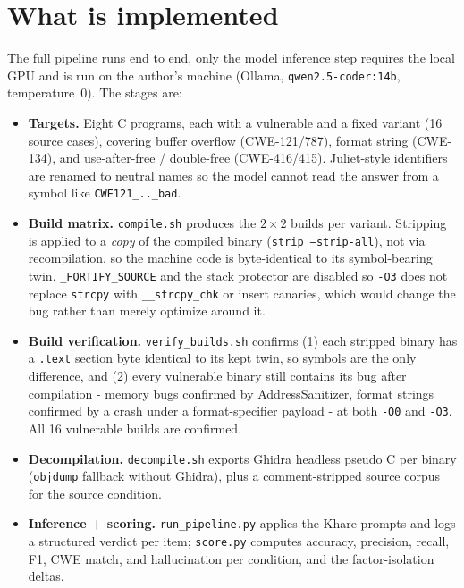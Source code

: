 \documentclass[10pt]{article}
\begin{document}
\section{What is implemented}
The full pipeline runs end to end, only the model inference step requires the
local GPU and is run on the author's machine (Ollama, \texttt{qwen2.5-coder:14b},
temperature~0). The stages are:
\begin{itemize}
\item \textbf{Targets.} Eight C programs, each with a vulnerable and a fixed
variant (16 source cases), covering buffer overflow (CWE-121/787), format string
(CWE-134), and use-after-free / double-free (CWE-416/415). Juliet-style
identifiers are renamed to neutral names so the model cannot read the answer from
a symbol like \texttt{CWE121\_..\_bad}.
\item \textbf{Build matrix.} \texttt{compile.sh} produces the $2\times2$ builds per
variant. Stripping is applied to a \emph{copy} of the compiled binary
(\texttt{strip --strip-all}), not via recompilation, so the machine code is
byte-identical to its symbol-bearing twin. \texttt{\_FORTIFY\_SOURCE} and the
stack protector are disabled so \texttt{-O3} does not replace \texttt{strcpy}
with \texttt{\_\_strcpy\_chk} or insert canaries, which would change the bug
rather than merely optimize around it.
\item \textbf{Build verification.} \texttt{verify\_builds.sh} confirms (1) each
stripped binary has a \texttt{.text} section byte identical to its kept twin, so
symbols are the only difference, and (2) every vulnerable binary still contains
its bug after compilation - memory bugs confirmed by AddressSanitizer, format
strings confirmed by a crash under a format-specifier payload - at both
\texttt{-O0} and \texttt{-O3}. All 16 vulnerable builds are confirmed.
\item \textbf{Decompilation.} \texttt{decompile.sh} exports Ghidra headless
pseudo C per binary (\texttt{objdump} fallback without Ghidra),
plus a comment-stripped source corpus for the source condition.
\item \textbf{Inference + scoring.} \texttt{run\_pipeline.py} applies the Khare
prompts and logs a structured verdict per item; \texttt{score.py} computes
accuracy, precision, recall, F1, CWE match, and hallucination per condition, and
the factor-isolation deltas.
\end{itemize}
\end{document}
